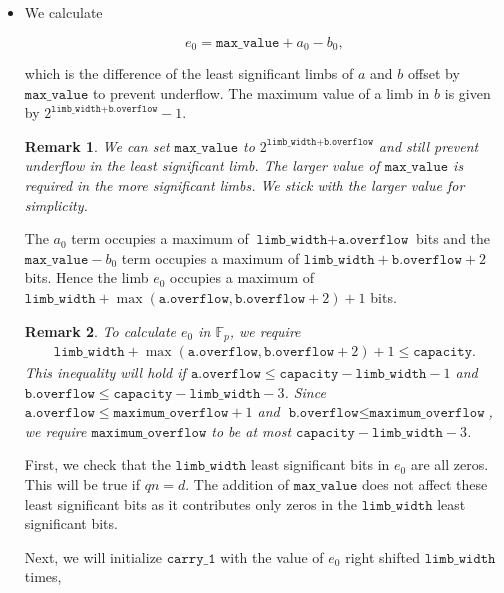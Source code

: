 \documentclass[a4paper, 12pt]{article}
\newtheorem*{remark}{Remark}
\begin{document}
\begin{itemize}
  \item We calculate 

    $$e_0 = \texttt{max\_value} + a_0 - b_0,$$

    which is the difference of the least significant limbs of $a$ and $b$ offset by $\texttt{max\_value}$ to prevent underflow.  The maximum value of a limb in $b$ is given by $2^{\texttt{limb\_width} + \texttt{b.overflow}}-1$.

    \begin{remark}
    We can set $\texttt{max\_value}$ to $2^{\texttt{limb\_width}+\texttt{b.overflow}}$ and still prevent underflow in the least significant limb. The larger value of $\texttt{max\_value}$ is required in the more significant limbs. We stick with the larger value for simplicity.
    \end{remark}
    
    The $a_0$ term occupies a maximum of $\texttt{limb\_width} + \texttt{a.overflow}$ bits and the $\texttt{max\_value} - b_0$ term occupies a maximum of $\texttt{limb\_width} + \texttt{b.overflow} + 2$ bits. Hence the limb $e_0$ occupies a maximum of $\texttt{limb\_width} + \max(\texttt{a.overflow}, \texttt{b.overflow} + 2) + 1$ bits.

    \begin{remark}
    To calculate $e_0$ in $\mathbb{F}_p$, we require 
\begin{align*}
  \texttt{limb\_width} + \max(\texttt{a.overflow}, \texttt{b.overflow} + 2) + 1 \le \texttt{capacity}.
\end{align*}
This inequality will hold if $\texttt{a.overflow} \le \texttt{capacity} - \texttt{limb\_width} - 1$ and $\texttt{b.overflow} \le \texttt{capacity} - \texttt{limb\_width} - 3$. Since $\texttt{a.overflow} \le \texttt{maximum\_overflow} + 1$ and $\texttt{b.overflow} \le \texttt{maximum\_overflow}$, we require $\texttt{maximum\_overflow}$ to be at most $\texttt{capacity} - \texttt{limb\_width} - 3$.
    \end{remark}
    
    First, we check that the $\texttt{limb\_width}$ least significant bits in $e_0$ are all zeros. This will be true if $qn = d$. The addition of $\texttt{max\_value}$ does not affect these least significant bits as it contributes only zeros in the $\texttt{limb\_width}$ least significant bits.

    Next, we will initialize $\texttt{carry\_1}$ with the value of $e_0$ right shifted $\texttt{limb\_width}$ times,
    

\end{itemize}
\end{document}
